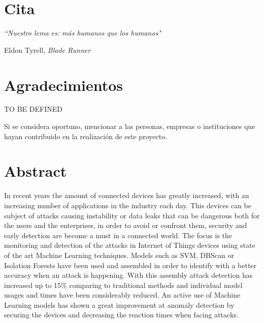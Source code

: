 \chapter*{Cita}

\setlength{}
\setlength\epigraphrule{0pt}

\epigraph{\itshape``Nuestro lema es: más humanos que los humanos"}{Eldon Tyrell, \textit{Blade Runner}}

\chapter*{Agradecimientos}

TO BE DEFINED

Si se considera oportuno, mencionar a las personas, empresas o instituciones que hayan contribuido en la realización de este proyecto.

\chapter*{Abstract}

\onehalfspacing

In recent years the amount of connected devices has greatly increased, with an increasing number of applications in the industry each day. This devices can be subject of attacks causing instability or data leaks that can be dangerous both for the users and the enterprises, in order to avoid or confront them, security and early detection are become a must in a connected world. The focus is the monitoring and detection of the attacks in Internet of Things devices using state of the art Machine Learning techniques. Models such as SVM, DBScan or Isolation Forests have been used and assembled in order to identify with a better accuracy when an attack is happening. With this assembly attack detection has increased up to 15\% comparing to traditional methods and individual model usages and times have been considerably reduced. An active use of Machine Learning models has shown a great improvement at anomaly detection by securing the devices and decreasing the reaction times when facing attacks.

\vspace{0.5cm}

